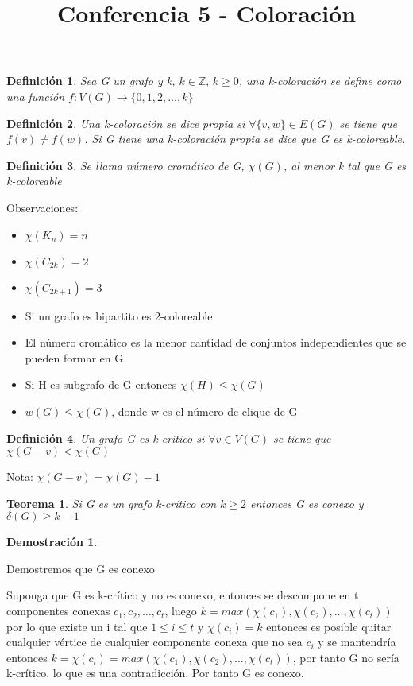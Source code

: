 \documentclass[a4paper,1pt]{report}
\title{Conferencia 5 - Coloración}
\author{}
\newtheorem*{teo}{Teorema}
\newtheorem*{dem}{Demostración}
\newtheorem*{dfn}{Definición}
\begin{document}
\maketitle

\begin{dfn}
 Sea G un grafo y k, $k\in\mathbb{Z},\,k\geq 0$, una k-coloración se define como una función
 $f:V(G)\rightarrow\{0,1,2,\dots,k\}$
\end{dfn}

\begin{dfn}
 Una k-coloración se dice propia si $\forall \{v,w\}\in E(G)$ se tiene que $f(v)\neq f(w)$. Si G tiene una k-coloración propia se dice que G es k-coloreable.
\end{dfn}

\begin{dfn}
 Se llama número cromático de G, $\chi (G)$, al menor k tal que G es k-coloreable
\end{dfn}

Observaciones:
\begin{itemize}
 \item $\chi (K_n)=n$
 \item $\chi (C_{2k})=2$
 \item $\chi (C_{2k+1})=3$
 \item Si un grafo es bipartito es 2-coloreable
 \item El número cromático es la menor cantidad de conjuntos independientes que se pueden formar en G
 \item Si H es subgrafo de G entonces $\chi (H)\leq \chi (G)$
 \item $w(G)\leq \chi (G)$, donde w es el número de clique de G
\end{itemize}

\begin{dfn}
 Un grafo G es k-crítico si  $\forall v\in V(G)$ se tiene que $\chi (G-v)<\chi (G)$
\end{dfn}

Nota: $\chi (G-v)=\chi (G)-1$

\begin{teo}
 Si G es un grafo k-crítico con $k\geq 2$ entonces G es conexo y $\delta (G)\geq k-1$
\end{teo}

\begin{dem}
 
\end{dem}


Demostremos que G es conexo

Suponga que G es k-crítico y no es conexo, entonces se descompone en t componentes conexas $c_1,c_2,\dots,c_t$, luego $k=max(\chi(c_1),\chi(c_2),\dots,\chi(c_t))$ por lo que existe un i tal que $1\leq i \leq t$ y $\chi(c_i)=k$ entonces es posible quitar cualquier vértice de cualquier componente conexa que no sea $c_i$ y se mantendría entonces $k=\chi(c_i)=max(\chi(c_1),\chi(c_2),\dots,\chi(c_t))$, por tanto G no sería k-crítico, lo que es una contradicción. Por tanto G es conexo.\\
\end{document}

